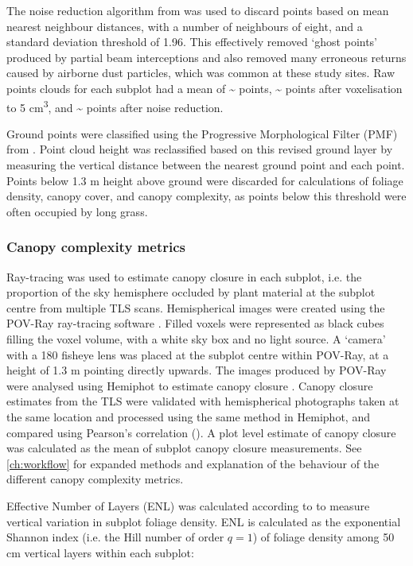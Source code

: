 \begin{refsection}
The noise reduction algorithm from \citet{Rusu2008} was used to discard points based on mean nearest neighbour distances, with a number of neighbours of eight, and a standard deviation threshold of 1.96. This effectively removed `ghost points' produced by partial beam interceptions and also removed many erroneous returns caused by airborne dust particles, which was common at these study sites. Raw points clouds for each subplot had a mean of \textasciitilde{}\rawpt{} points, \textasciitilde{}\voxelpt{} points after voxelisation to 5 cm\textsuperscript{3}, and \textasciitilde{}\subpt{} points after noise reduction. 

Ground points were classified using the Progressive Morphological Filter (PMF) from \citet{Zhang2003}. Point cloud height was reclassified based on this revised ground layer by measuring the vertical distance between the nearest ground point and each point. Points below 1.3 m height above ground were discarded for calculations of foliage density, canopy cover, and canopy complexity, as points below this threshold were often occupied by long grass.

\subsubsection{Canopy complexity metrics}
\label{tls:sssec:canopy_metrics}

Ray-tracing was used to estimate canopy closure in each subplot, i.e. the proportion of the sky hemisphere occluded by plant material at the subplot centre from multiple TLS scans. Hemispherical images were created using the POV-Ray ray-tracing software \citep{Povray2004}. Filled voxels were represented as black cubes filling the voxel volume, with a white sky box and no light source. A `camera' with a 180\textdegree{} fisheye lens was placed at the subplot centre within POV-Ray, at a height of 1.3 m pointing directly upwards. The images produced by POV-Ray were analysed using Hemiphot to estimate canopy closure \citep{HemiPhot}. Canopy closure estimates from the TLS were validated with hemispherical photographs taken at the same location and processed using the same method in Hemiphot, and compared using Pearson's correlation (\hemiCor{}). A plot level estimate of canopy closure was calculated as the mean of subplot canopy closure measurements. See \autoref{ch:workflow} for expanded methods and explanation of the behaviour of the different canopy complexity metrics.

Effective Number of Layers (ENL) was calculated according to \citet{Ehbrecht2016} to measure vertical variation in subplot foliage density. ENL is calculated as the exponential Shannon index (i.e. the Hill number of order $q=1$) of foliage density among 50 cm vertical layers within each subplot:


\end{refsection}
